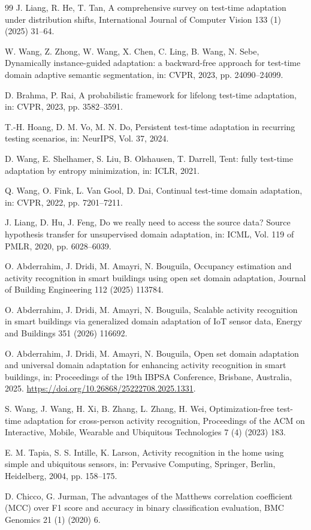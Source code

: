 \documentclass[a4paper,fleqn]{cas-dc}
\begin{document}
\begin{thebibliography}{99}
 J. Liang, R. He, T. Tan, A comprehensive survey on test-time adaptation
under distribution shifts, International Journal of Computer Vision 133 (1) (2025) 31--64.

 W. Wang, Z. Zhong, W. Wang, X. Chen, C. Ling, B. Wang, N. Sebe, Dynamically
instance-guided adaptation: a backward-free approach for test-time domain adaptive semantic
segmentation, in: CVPR, 2023, pp. 24090--24099.

 D. Brahma, P. Rai, A probabilistic framework for lifelong test-time
adaptation, in: CVPR, 2023, pp. 3582--3591.

 T.-H. Hoang, D. M. Vo, M. N. Do, Persistent test-time adaptation in
recurring testing scenarios, in: NeurIPS, Vol. 37, 2024.

 D. Wang, E. Shelhamer, S. Liu, B. Olshausen, T. Darrell, Tent: fully
test-time adaptation by entropy minimization, in: ICLR, 2021.

 Q. Wang, O. Fink, L. Van Gool, D. Dai, Continual test-time domain
adaptation, in: CVPR, 2022, pp. 7201--7211.

 J. Liang, D. Hu, J. Feng, Do we really need to access the source data?
Source hypothesis transfer for unsupervised domain adaptation, in: ICML, Vol. 119 of PMLR,
2020, pp. 6028--6039.

 O. Abderrahim, J. Dridi, M. Amayri, N. Bouguila, Occupancy
estimation and activity recognition in smart buildings using open set domain adaptation,
Journal of Building Engineering 112 (2025) 113784.

 O. Abderrahim, J. Dridi, M. Amayri, N. Bouguila, Scalable activity
recognition in smart buildings via generalized domain adaptation of IoT sensor data, Energy
and Buildings 351 (2026) 116692.

 O. Abderrahim, J. Dridi, M. Amayri, N. Bouguila, Open set domain
adaptation and universal domain adaptation for enhancing activity recognition in smart
buildings, in: Proceedings of the 19th IBPSA Conference, Brisbane, Australia, 2025.
\url{https://doi.org/10.26868/25222708.2025.1331}.

 S. Wang, J. Wang, H. Xi, B. Zhang, L. Zhang, H. Wei, Optimization-free
test-time adaptation for cross-person activity recognition, Proceedings of the ACM on
Interactive, Mobile, Wearable and Ubiquitous Technologies 7 (4) (2023) 183.

 E. M. Tapia, S. S. Intille, K. Larson, Activity recognition in the
home using simple and ubiquitous sensors, in: Pervasive Computing, Springer, Berlin,
Heidelberg, 2004, pp. 158--175.

 D. Chicco, G. Jurman, The advantages of the Matthews correlation
coefficient (MCC) over F1 score and accuracy in binary classification evaluation, BMC
Genomics 21 (1) (2020) 6.

\end{thebibliography}
\end{document}
